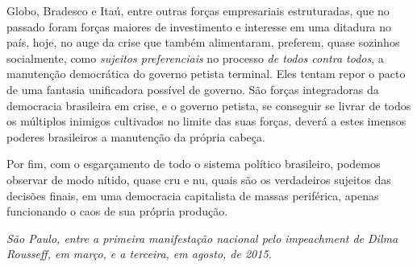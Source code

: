 Globo, Bradesco e Itaú, entre outras forças empresariais estruturadas,
que no passado foram forças maiores de investimento e interesse em uma
ditadura no país, hoje, no auge da crise que também alimentaram,
preferem, quase sozinhos socialmente, como \emph{sujeitos preferenciais}
no processo \emph{de todos contra todos}, a manutenção democrática do
governo petista terminal. Eles tentam repor o pacto de uma fantasia
unificadora possível de governo. São forças integradoras da democracia
brasileira em crise, e o governo petista, se conseguir se livrar de
todos os múltiplos inimigos cultivados no limite das suas forças, deverá
a estes imensos poderes brasileiros a manutenção da própria cabeça.

Por fim, com o esgarçamento de todo o sistema político brasileiro,
podemos observar de modo nítido, quase cru e nu, quais são os
verdadeiros sujeitos das decisões finais, em uma democracia capitalista
de massas periférica, apenas funcionando o caos de sua própria produção.

\bigskip\hfill\begin{minipage}{.7\textwidth}
\emph{São Paulo, entre a primeira manifestação nacional pelo impeachment
de Dilma Rousseff, em março, e a terceira, em agosto, de 2015.}
\end{minipage}
